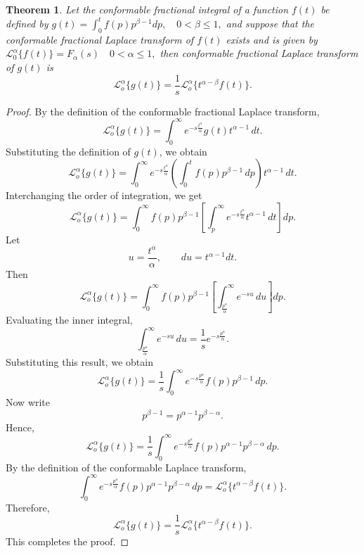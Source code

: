 \documentclass[two side,reqno,12pt]{amsart}
\numberwithin{equation}{section}
\newtheorem{theorem}[lemma]{Theorem}
\theoremstyle{definition}
\begin{document}
\begin{theorem}\label{thm:3.4}
Let the conformable fractional integral of a function
$f(t)$ be defined by
$
g(t)=\int_{0}^{t}f(p)p^{\beta-1}dp,\quad 0<\beta\le 1,
$
and suppose that the conformable fractional Laplace transform of 
$f(t)$ exists and is given by
$
\mathcal{L}_0^{\alpha}\{f(t)\}=F_{\alpha}(s)\quad0<\alpha\le 1,
$ then conformable fractional Laplace transform of $g(t)$ is
\[
\mathcal{L}_{o}^{\alpha}\{g(t)\}=\frac{1}{s}\mathcal{L}_{o}^{\alpha}\{t^{\alpha-\beta}f(t)\}.
\]
\end{theorem}
\begin{proof}
  By the definition of the conformable fractional Laplace transform,
\[
\mathcal{L}_{o}^{\alpha}\{g(t)\}
=
\int_{0}^{\infty} e^{-s\frac{t^{\alpha}}{\alpha}} g(t)t^{\alpha-1}\,dt.
\]
Substituting the definition of $g(t)$, we obtain
\[
\mathcal{L}_{o}^{\alpha}\{g(t)\}
=
\int_{0}^{\infty} e^{-s\frac{t^{\alpha}}{\alpha}}
\left(\int_{0}^{t} f(p)p^{\beta-1}\,dp\right)t^{\alpha-1}\,dt.
\]
Interchanging the order of integration, we get
\[
\mathcal{L}_{o}^{\alpha}\{g(t)\}
=
\int_{0}^{\infty} f(p)p^{\beta-1}
\left[
\int_{p}^{\infty} e^{-s\frac{t^{\alpha}}{\alpha}}t^{\alpha-1}\,dt
\right]dp.
\]
Let
\[
u=\frac{t^{\alpha}}{\alpha}, \qquad du=t^{\alpha-1}dt.
\]
Then
\[
\mathcal{L}_{o}^{\alpha}\{g(t)\}
=
\int_{0}^{\infty} f(p)p^{\beta-1}
\left[
\int_{\frac{p^{\alpha}}{\alpha}}^{\infty} e^{-su}\,du
\right]dp.
\]
Evaluating the inner integral,
\[
\int_{\frac{p^{\alpha}}{\alpha}}^{\infty} e^{-su}\,du
=\frac{1}{s}e^{-s\frac{p^{\alpha}}{\alpha}}.
\]
Substituting this result, we obtain
\[
\mathcal{L}_{o}^{\alpha}\{g(t)\}
= \frac{1}{s}\int_{0}^{\infty} e^{-s\frac{p^{\alpha}}{\alpha}} f(p)p^{\beta-1}\,dp.
\]
Now write
\[
p^{\beta-1}=p^{\alpha-1}p^{\beta-\alpha}.
\]
Hence,
\[
\mathcal{L}_{o}^{\alpha}\{g(t)\}
=
\frac{1}{s}\int_{0}^{\infty} e^{-s\frac{p^{\alpha}}{\alpha}} f(p)p^{\alpha-1}p^{\beta-\alpha}\,dp.
\]
By the definition of the conformable Laplace transform,
\[
\int_{0}^{\infty} e^{-s\frac{p^{\alpha}}{\alpha}} f(p)p^{\alpha-1}p^{\beta-\alpha}\,dp
= \mathcal{L}_{o}^{\alpha}\{t^{\alpha-\beta}f(t)\}.
\]
Therefore,
\[
\mathcal{L}_{o}^{\alpha}\{g(t)\}=\frac{1}{s}\mathcal{L}_{o}^{\alpha}\{t^{\alpha-\beta}f(t)\}.
\]
This completes the proof.
\end{proof}
\end{document}
